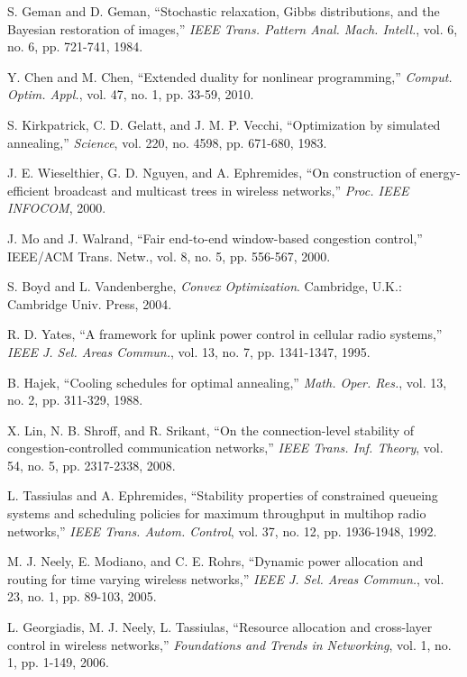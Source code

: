 \documentclass[10pt,journal,letterpaper,compsoc]{IEEEtran}
\begin{document}
{{\begin{thebibliography}{10}
S. Geman and D. Geman, ``Stochastic relaxation, Gibbs distributions, and the Bayesian restoration of images,'' \emph{IEEE Trans. Pattern Anal. Mach. Intell.}, vol. 6, no. 6, pp. 721-741, 1984.


Y. Chen and M. Chen, ``Extended duality for nonlinear programming,'' \emph{Comput. Optim. Appl.}, vol. 47, no. 1, pp. 33-59, 2010.

S. Kirkpatrick, C. D. Gelatt, and J. M. P. Vecchi, ``Optimization by simulated annealing,'' \emph{Science}, vol. 220, no. 4598, pp. 671-680, 1983.


J. E. Wieselthier, G. D. Nguyen, and A. Ephremides, ``On construction of energy-efficient broadcast and multicast trees in wireless networks,''
\emph{Proc. IEEE INFOCOM}, 2000.

J. Mo and J. Walrand, ``Fair end-to-end window-based congestion control,'' IEEE/ACM Trans. Netw., vol. 8, no. 5, pp. 556-567, 2000.

S. Boyd and L. Vandenberghe, \emph{Convex Optimization}. Cambridge, U.K.: Cambridge Univ. Press, 2004.



R. D. Yates, ``A framework for uplink power control in cellular radio systems,'' \emph{IEEE J. Sel. Areas Commun.}, vol. 13, no. 7, pp. 1341-1347, 1995.




B. Hajek, ``Cooling schedules for optimal annealing,'' \emph{Math. Oper. Res.}, vol. 13, no. 2, pp. 311-329, 1988.

X. Lin, N. B. Shroff, and R. Srikant, ``On the connection-level stability of congestion-controlled communication networks,'' \emph{IEEE Trans.
Inf. Theory}, vol. 54, no. 5, pp. 2317-2338, 2008.

L. Tassiulas and A. Ephremides, ``Stability properties of constrained queueing systems and scheduling policies for maximum throughput in multihop radio networks,'' \emph{IEEE Trans. Autom. Control}, vol. 37, no. 12, pp. 1936-1948, 1992.

M. J. Neely, E. Modiano, and C. E. Rohrs, ``Dynamic power allocation and routing for time varying wireless networks,'' \emph{IEEE J. Sel. Areas Commun.}, vol. 23, no. 1, pp. 89-103, 2005.

L. Georgiadis, M. J. Neely, L. Tassiulas, ``Resource allocation and cross-layer control in wireless networks,'' \emph{Foundations and Trends in
Networking}, vol. 1, no. 1, pp. 1-149, 2006.


\end{thebibliography}}}
\end{document}
